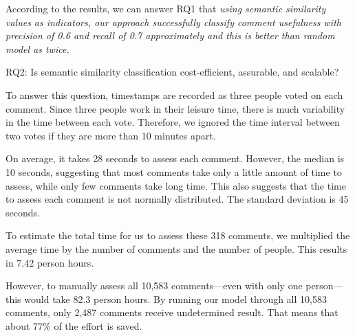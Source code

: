 According to the results, we can answer RQ1 that \emph{using semantic similarity values as indicators, our approach successfully classify comment usefulness with precision of 0.6 and recall of 0.7 approximately and this is better than random model as twice.}








\begin{ResearchQuestions}
\item[RQ2:] Is semantic similarity classification cost-efficient, assurable, and scalable?
\end{ResearchQuestions}

To answer this question, timestamps are recorded as three people voted on each comment.
Since three people work in their leisure time, there is much variability in the time between each vote.
Therefore, we ignored the time interval between two votes if they are more than 10 minutes apart.

On average, it takes 28 seconds to assess each comment.
However, the median is 10 seconds, suggesting that most comments take only a little amount of time to assess, while only few comments take long time.
This also suggests that the time to assess each comment is not normally distributed.
The standard deviation is 45 seconds.

To estimate the total time for us to assess these 318 comments,
we multiplied the average time by the number of comments and the number of people.
This results in 7.42 person hours.

However, to manually assess all 10,583 comments---even with only one person---this would take 82.3 person hours.
By running our model through all 10,583 comments, only 2,487 comments receive undetermined result.
That means that about 77\% of the effort is saved.

